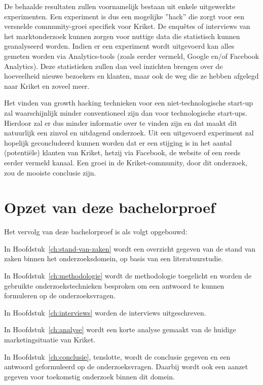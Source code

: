 De behaalde resultaten zullen voornamelijk bestaan uit enkele uitgewerkte experimenten. Een experiment is dus een mogelijke ”hack” die zorgt voor een versnelde community-groei specifiek voor Kriket. De enquêtes of interviews van het marktonderzoek kunnen zorgen voor nuttige data die statistisch kunnen geanalyseerd worden. Indien er een experiment wordt uitgevoerd kan alles gemeten worden via Analytics-tools (zoals eerder vermeld, Google en/of Facebook Analytics). Deze statistieken zullen dan veel inzichten brengen over de hoeveelheid nieuwe bezoekers en klanten, maar ook de weg die ze hebben afgelegd naar Kriket en zoveel meer.

Het vinden van growth hacking technieken voor een niet-technologische start-up zal waarschijnlijk minder conventioneel zijn dan voor technologische start-ups. Hierdoor zal er dus minder informatie over te vinden zijn en dat maakt dit natuurlijk een zinvol en uitdagend onderzoek.
Uit een uitgevoerd experiment zal hopelijk geconcludeerd kunnen worden dat er een stijging is in het aantal (potentiële) klanten van Kriket, hetzij via Facebook, de website of een reeds eerder vermeld kanaal. Een groei in de Kriket-community, door dit onderzoek, zou de mooiste conclusie zijn.

\section{Opzet van deze bachelorproef}
\label{sec:opzet-bachelorproef}


Het vervolg van deze bachelorproef is als volgt opgebouwd:

In Hoofdstuk~\ref{ch:stand-van-zaken} wordt een overzicht gegeven van de stand van zaken binnen het onderzoeksdomein, op basis van een literatuurstudie.

In Hoofdstuk~\ref{ch:methodologie} wordt de methodologie toegelicht en worden de gebruikte onderzoekstechnieken besproken om een antwoord te kunnen formuleren op de onderzoeksvragen.

In Hoofdstuk~\ref{ch:interviews} worden de interviews uitgeschreven.

In Hoofdstuk~\ref{ch:analyse} wordt een korte analyse gemaakt van de huidige marketingsituatie van Kriket.

In Hoofdstuk~\ref{ch:conclusie}, tenslotte, wordt de conclusie gegeven en een antwoord geformuleerd op de onderzoeksvragen. Daarbij wordt ook een aanzet gegeven voor toekomstig onderzoek binnen dit domein.

